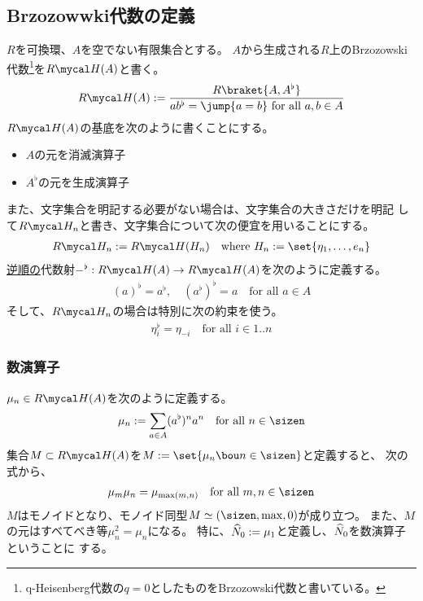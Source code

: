 {\subsection{Brzozowwki代数の定義}\label{s2:Brzozowwki代数の定義} %
	$R$を可換環、$A$を空でない有限集合とする。
	$A$から生成される$R$上のBrzozowski代数\footnote{
		q-Heisenberg代数の$q=0$としたものをBrzozowski代数と書いている。
	}を$R\Eta(A)$と書く。
	\begin{equation*}\begin{split}
		R\Eta(A) := \frac{R\braket{A,A^\flat}}
			{ab^\flat = \jump{a=b} \text{ for all }a,b\in A} 
	\end{split}\end{equation*}
	$R\Eta(A)$の基底を次のように書くことにする。
	\begin{itemize}\setlength{\itemsep}{-1mm} %
		\item $A$の元を消滅演算子
		\item $A^\flat$の元を生成演算子
	\end{itemize} %
	また、文字集合を明記する必要がない場合は、文字集合の大きさだけを明記
	して$R\Eta_n$と書き、文字集合について次の便宜を用いることにする。
	\begin{equation*}\begin{split}
		R\Eta_n := R\Eta(H_n) \quad\text{where } H_n := \set{\eta_1,\dots,e_n}
	\end{split}\end{equation*}
	\underline{逆順の}代数射$-^\flat:R\Eta(A)\to R\Eta(A)$を次のように定義する。
	\begin{equation*}\begin{split}
		(a)^\flat = a^\flat,\quad (a^\flat)^\flat = a
		\quad\text{for all } a\in A
	\end{split}\end{equation*}
	そして、$R\Eta_n$の場合は特別に次の約束を使う。
	\begin{equation*}\begin{split}
		\eta_i^\flat = \eta_{-i} \quad\text{for all } i\in1..n
	\end{split}\end{equation*}

\subsubsection{数演算子}\label{s3:数演算子} %
	$\mu_n\in R\Eta(A)$を次のように定義する。
	\begin{equation*}\begin{split}
		\mu_n := \sum_{a\in A} (a^\flat)^na^n \quad\text{for all } n\in\sizen
	\end{split}\end{equation*}
	集合$M\subset R\Eta(A)$を$M:=\set{\mu_n\bou n\in\sizen}$と定義すると、
	次の式から、
	\begin{equation*}\begin{split}
		\mu_m\mu_n = \mu_{\max(m,n)} \quad\text{for all } m,n\in\sizen
	\end{split}\end{equation*}
	$M$はモノイドとなり、モノイド同型$M\simeq(\sizen,\max,0)$が成り立つ。
	また、$M$の元はすべてべき等$\mu_n^2=\mu_n$になる。
	特に、$\widehat{N}_0:=\mu_1$と定義し、$\widehat{N}_0$を数演算子ということに
	する。
}
